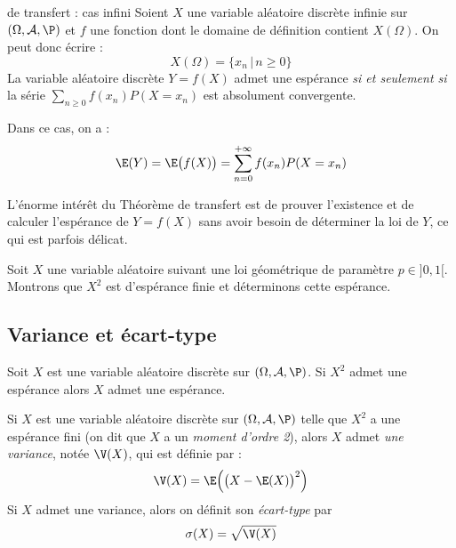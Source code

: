 \documentclass[french,11pt,twoside]{VcCours}
\begin{document}
\begin{Theoreme}{de transfert : cas infini}
Soient $X$ une variable aléatoire discrète infinie sur $(\Omega, \mathcal{A}, \P)$ et $f$ une fonction dont le domaine de définition contient $X(\Omega)$. On peut donc écrire :
$$ X(\Omega) = \lbrace x_n \, \vert \, n \geq 0 \rbrace$$
La variable aléatoire discrète $Y=f(X)$ admet une espérance \emph{si et seulement si} la série \linebreak $\sum_{n \geq 0} f(x_n) P(X=x_n)$ est absolument convergente. 

Dans ce cas, on a :
\[\E(Y)=\E\big(f(X)\big)= \sum_{n = 0}^{+ \infty} f(x_n) P(X=x_n)\]
\end{Theoreme}

\begin{Remarque}{}
L'énorme intérêt du Théorème de transfert est de prouver l'existence et de calculer l'espérance de $Y=f(X)$ sans avoir besoin de déterminer la loi de $Y$, ce qui est parfois délicat.
\end{Remarque}

\begin{Exemple}{} Soit $X$ une variable aléatoire suivant une loi géométrique de paramètre $p \in ]0,1[$. Montrons que $X^2$ est d'espérance finie et déterminons cette espérance.

\vspace*{9cm}
\end{Exemple}


\subsection{Variance et écart-type}
\begin{Proposition}{} Soit $X$ est une variable aléatoire discrète sur $(\Omega, \mathcal{A}, \P)$. Si $X^2$ admet une espérance alors $X$ admet une espérance.
\end{Proposition}

\begin{Demonstration}{}

\vspace*{5cm}
\end{Demonstration}

\begin{TheoremeDefinition}{}
Si $X$ est une variable aléatoire discrète sur $(\Omega, \mathcal{A}, \P)$  telle que $X^2$ a une espérance fini (on dit que $X$ a un \emph{moment d'ordre 2}), alors $X$ admet \emph{une variance}, notée $\V(X)$, qui est définie par :
$$\V(X) = \E\Big(\big(X-\E(X)\big)^2\Big)$$
Si $X$ admet une variance, alors on définit son \emph{écart-type} par 
$$\sigma (X) = \sqrt{\V(X)}$$
\end{TheoremeDefinition}{}
\end{document}
